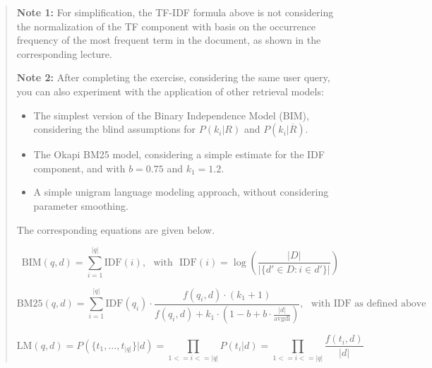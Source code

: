 \documentclass[12pt]{article}
\begin{document}
\begin{quote}
    \textbf{Note 1:} For simplification, the TF-IDF formula above is not considering the normalization of the TF component with basis on the occurrence frequency of the most frequent term in the document, as shown in the corresponding lecture.
    
    \textbf{Note 2:} After completing the exercise, considering the same user query, you can also experiment with the application of other retrieval models:
    \begin{itemize}
    \item The simplest version of the Binary Independence Model (BIM), considering the blind assumptions for $P(k_i|R)$ and $P(k_i|\overline{R})$.
    \item The Okapi BM25 model, considering a simple estimate for the IDF component, and with $b=0.75$ and $k_1=1.2$.
    \item A simple unigram language modeling approach, without considering parameter smoothing.
    \end{itemize}
    The corresponding equations are given below.
    
    \begin{center}
    \begin{equation*}
	\mathrm{BIM}(q,d) = \sum _{i=1}^{|q|} \mathrm{IDF}(i), \text{~~with~~} \mathrm{IDF}(i) = \log \left( \frac{|D|}{|\{d' \in D: i \in d'\}|} \right)
	\end{equation*}
    \end{center}
    
    \begin{center}
    \begin{equation*}
{ {\text{BM25}}(q,d)=\sum _{i=1}^{|q|}{\text{IDF}}(q_{i})\cdot {\frac {f(q_{i},d)\cdot (k_{1}+1)}{f(q_{i},d)+k_{1}\cdot \left(1-b+b\cdot {\frac {|d|}{\text{avgdl}}}\right)}},} \text{~~with IDF as defined above}
    \end{equation*}
    \end{center}
    
    \begin{center}
    \begin{equation*}
	\mathrm{LM}(q,d) = P(\{t_1,\ldots,t_{|q|}\}|d) = \prod_{1<=i<=|q|} P(t_i|d) = \prod_{1<=i<=|q|} \frac{f(t_i,d)}{|d|}
	\end{equation*}
    \end{center}
\end{quote}
\end{document}
